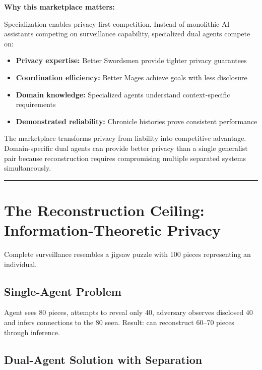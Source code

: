 \documentclass[
]{article}
\begin{document}
\textbf{Why this marketplace matters:}

Specialization enables privacy-first competition. Instead of monolithic
AI assistants competing on surveillance capability, specialized dual
agents compete on:

\begin{itemize}
\item
  \textbf{Privacy expertise:} Better Swordsmen provide tighter privacy
  guarantees
\item
  \textbf{Coordination efficiency:} Better Mages achieve goals with less
  disclosure
\item
  \textbf{Domain knowledge:} Specialized agents understand
  context-specific requirements
\item
  \textbf{Demonstrated reliability:} Chronicle histories prove
  consistent performance
\end{itemize}

The marketplace transforms privacy from liability into competitive
advantage. Domain-specific dual agents can provide better privacy than a
single generalist pair because reconstruction requires compromising
multiple separated systems simultaneously.

\begin{center}\rule{0.5\linewidth}{0.5pt}\end{center}

\section{The Reconstruction Ceiling: Information-Theoretic
Privacy}\label{the-reconstruction-ceiling-information-theoretic-privacy}

Complete surveillance resembles a jigsaw puzzle with 100 pieces
representing an individual.

\subsection{Single-Agent Problem}\label{single-agent-problem}

Agent sees 80 pieces, attempts to reveal only 40, adversary observes
disclosed 40 and infers connections to the 80 seen. Result: can
reconstruct 60--70 pieces through inference.

\subsection{Dual-Agent Solution with
Separation}\label{dual-agent-solution-with-separation}
\end{document}

